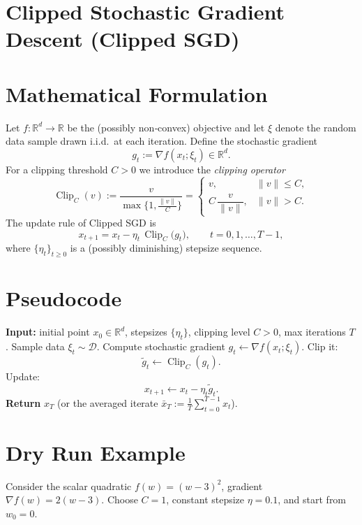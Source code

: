 \documentclass{article}
\newcommand{\R}{\mathbb{R}}
\begin{document}
\section*{Clipped Stochastic Gradient Descent (Clipped SGD)}

\section*{Mathematical Formulation}
Let $f:\R^{d}\to\R$ be the (possibly non‑convex) objective and let $\xi$ denote the random data sample drawn i.i.d.\ at each iteration.
Define the stochastic gradient
\[
g_{t}:=\nabla f(x_{t};\xi_{t})\in\R^{d}.
\]
For a clipping threshold $C>0$ we introduce the \emph{clipping operator}
\[
\operatorname{Clip}_{C}(v):=
\frac{v}{\max\!\Big\{1,\frac{\|v\|}{C}\Big\}}
=
\begin{cases}
v, & \|v\|\le C,\\[4pt]
C\,\dfrac{v}{\|v\|}, & \|v\|>C .
\end{cases}
\tag{1}
\]
The update rule of Clipped SGD is
\[
x_{t+1}=x_{t}-\eta_{t}\,\operatorname{Clip}_{C}\!\big(g_{t}\big),
\qquad t=0,1,\dots ,T-1,
\tag{2}
\]
where $\{\eta_{t}\}_{t\ge0}$ is a (possibly diminishing) stepsize sequence.

\section*{Pseudocode}
\begin{algorithm}[H]
\caption{Clipped Stochastic Gradient Descent}
\begin{algorithmic}[1]
\State \textbf{Input:} initial point $x_{0}\in\R^{d}$, stepsizes $\{\eta_{t}\}$, clipping level $C>0$, max iterations $T$.
    \State Sample data $\xi_{t}\sim\mathcal{D}$.
    \State Compute stochastic gradient $g_{t}\gets \nabla f(x_{t};\xi_{t})$.
    \State Clip it:
    \[
    \tilde g_{t}\gets \operatorname{Clip}_{C}(g_{t}) .
    \]
    \State Update:
    \[
    x_{t+1}\gets x_{t}-\eta_{t}\tilde g_{t}.
    \]
\EndFor
\State \textbf{Return} $x_{T}$ (or the averaged iterate $\bar x_{T}:=\tfrac1T\sum_{t=0}^{T-1}x_{t}$).
\end{algorithmic}
\end{algorithm}

\section*{Dry Run Example}
Consider the scalar quadratic $f(w)=(w-3)^{2}$, gradient $\nabla f(w)=2(w-3)$.  
Choose $C=1$, constant stepsize $\eta=0.1$, and start from $w_{0}=0$.
\end{document}

